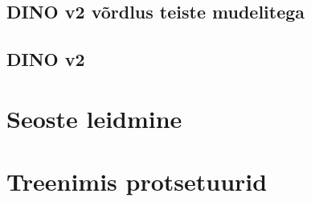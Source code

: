 \subsection{DINO v2 võrdlus teiste mudelitega}

 \subsection{DINO v2}


\section{Seoste leidmine}

\section{Treenimis protsetuurid}